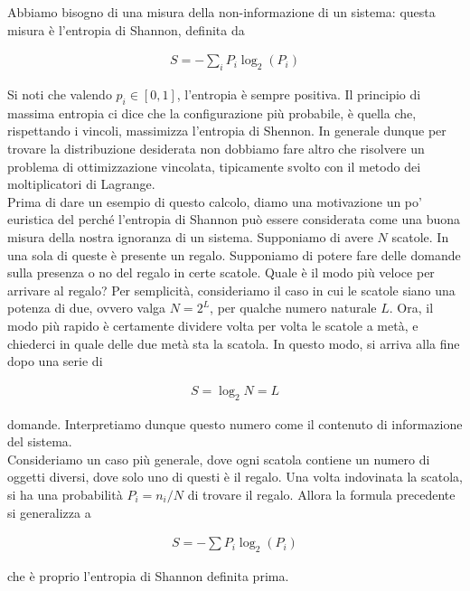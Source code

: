 \documentclass{report}
\begin{document}
Abbiamo bisogno di una misura della non-informazione di un sistema: questa misura è l'entropia di Shannon, definita da 

\begin{align}
    S = -\sum_i P_i \log_2 (P_i)
\end{align}

Si noti che valendo \(p_i \in [0, 1]\), l'entropia è sempre positiva. Il principio di massima entropia ci dice che la configurazione più probabile, è quella che, rispettando i vincoli, massimizza l'entropia di Shennon. In generale dunque per trovare la distribuzione desiderata non dobbiamo fare altro che risolvere un problema di ottimizzazione vincolata, tipicamente svolto con il metodo dei moltiplicatori di Lagrange.\\

Prima di dare un esempio di questo calcolo, diamo una motivazione un po' euristica del perché l'entropia di Shannon può essere considerata come una buona misura della nostra ignoranza di un sistema. Supponiamo di avere \(N\) scatole. In una sola di queste è presente un regalo. Supponiamo di potere fare delle domande sulla presenza o no del regalo in certe scatole. Quale è il modo più veloce per arrivare al regalo? 
Per semplicità, consideriamo il caso in cui le scatole siano una potenza di due, ovvero valga \(N = 2^L\), per qualche numero naturale \(L\). Ora, il modo più rapido è certamente dividere volta per volta le scatole a metà, e chiederci in quale delle due metà sta la scatola. In questo modo, si arriva alla fine dopo una serie di 

\begin{align}
    S = \log_2 N = L 
\end{align}

domande. Interpretiamo dunque questo numero come il contenuto di informazione del sistema. \\
Consideriamo un caso più generale, dove ogni scatola contiene un numero di oggetti diversi, dove solo uno di questi è il regalo. Una volta indovinata la scatola, si ha una probabilità \(P_i = n_i/N\) di trovare il regalo. Allora la formula precedente si generalizza a 

\begin{align}
    S = -\sum P_i \log_2 (P_i)
\end{align}

che è proprio l'entropia di Shannon definita prima. 
\end{document}
